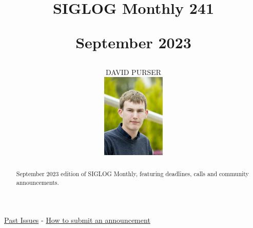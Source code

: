 \documentclass[prodmode,acmtecs]{acmsmall} %
\newcounter{colstart}
\begin{document}
\setcounter{colstart}{\thepage}

\title{{\huge\sc SIGLOG Monthly 241}

 September 2023}
\author{DAVID PURSER
\vspace*{-2.6cm}\begin{flushright}\includegraphics[width=30mm]{dp}\end{flushright}
}

\begin{abstract}
September 2023 edition of SIGLOG Monthly, featuring deadlines, calls and community announcements.
\end{abstract}


\maketitlee

\href{https://lics.siglog.org/newsletters/}{Past Issues}
 - 
\href{https://lics.siglog.org/newsletters/inst.html}{How to submit an announcement}
\end{document}
